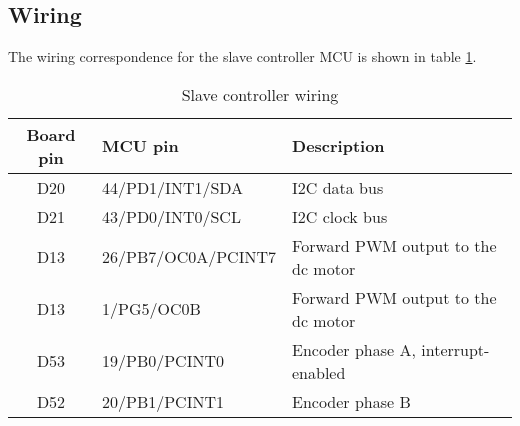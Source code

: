 \subsection{Wiring}
The wiring correspondence for the slave controller MCU is shown in table
\ref{tab:slave-wiring}.
\begin{table}[htb]
  \begin{tabularx}{\textwidth}{c l X}
    \toprule
    Board pin & MCU pin & Description \\
    \midrule
    D20 & 44/PD1/INT1/SDA    & I2C data bus \\
    D21 & 43/PD0/INT0/SCL    & I2C clock bus \\
    D13 & 26/PB7/OC0A/PCINT7 & Forward PWM output to the dc motor \\
    D13 & 1/PG5/OC0B         & Forward PWM output to the dc motor \\
    D53 & 19/PB0/PCINT0      & Encoder phase A, interrupt-enabled \\
    D52 & 20/PB1/PCINT1      & Encoder phase B \\
    \bottomrule
  \end{tabularx}
  \caption{Slave controller wiring}
  \label{tab:slave-wiring}
\end{table}
